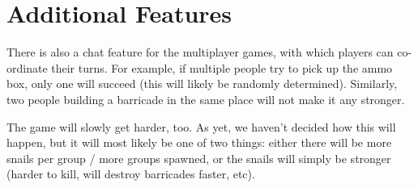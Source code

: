 \documentclass[a4wide, 11pt]{article}
\begin{document}
\section{Additional Features}

There is also a chat feature for the multiplayer games, with which players can co-ordinate their turns. For example, if multiple people try to pick up the ammo box, only one will succeed (this will likely be randomly determined). Similarly, two people building a barricade in the same place will not make it any stronger.

The game will slowly get harder, too. As yet, we haven’t decided how this will happen, but it will most likely be one of two things: either there will be more snails per group / more groups spawned, or the snails will simply be stronger (harder to kill, will destroy barricades faster, etc).
\end{document}
